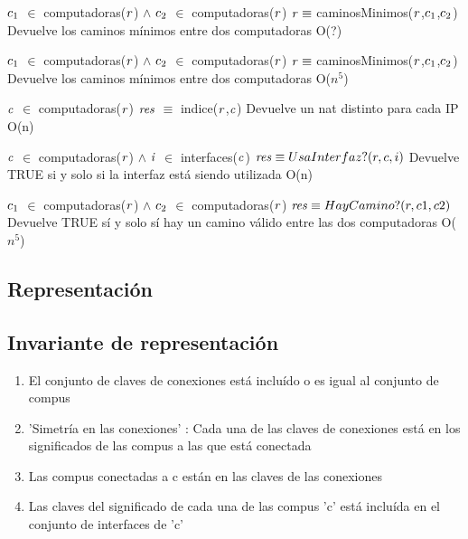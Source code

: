  {$\text{\textit{$c_{1}$}}$ $\in$ computadoras($\text{\textit{r}}$) $\land$ $\text{\textit{$c_{2}$}}$ $\in$ computadoras($\text{\textit{r}}$)}
 {$\text{\textit{r}} \equiv$ caminosMinimos($\text{\textit{r}}$,$\text{\textit{$c_{1}$}}$,$\text{\textit{$c_{2}$}}$)}
 {Devuelve los caminos mínimos entre dos computadoras}
 {O(?)}

 {$\text{\textit{$c_{1}$}}$ $\in$ computadoras($\text{\textit{r}}$) $\land$ $\text{\textit{$c_{2}$}}$ $\in$ computadoras($\text{\textit{r}}$)}
 {$\text{\textit{r}} \equiv$ caminosMinimos($\text{\textit{r}}$,$\text{\textit{$c_{1}$}}$,$\text{\textit{$c_{2}$}}$)}
 {Devuelve los caminos mínimos entre dos computadoras}
 {O($n^5$)}


 {$\text{\textit{c}}$ $\in$ computadoras($\text{\textit{r}}$)}
 {$\text{\textit{res}}$ $\equiv$ indice($\text{\textit{r}}$,$\text{\textit{c}}$)}
 {Devuelve un nat distinto para cada IP}
 {O(n)}

 {$\text{\textit{c}}$ $\in$ computadoras($\text{\textit{r}}$) $\land$ $\text{\textit{i}}$ $\in$ interfaces($\text{\textit{c}}$)}
 {$\text{\textit{res}} \equiv UsaInterfaz?(r,c,i)$}
 {Devuelve TRUE si y solo si la interfaz está siendo utilizada}
 {O(n)}

 {$\text{\textit{$c_{1}$}}$ $\in$ computadoras($\text{\textit{r}}$) $\land$ $\text{\textit{$c_{2}$}}$ $\in$ computadoras($\text{\textit{r}}$)}
 {$\text{\textit{res}} \equiv HayCamino?(r,c1,c2)$}
 {Devuelve TRUE sí y solo sí hay un camino válido entre las dos computadoras}
 {O($n^5$)}

\subsection{Representación}

\subsection{Invariante de representación}
\begin{enumerate}
\item El conjunto de claves de conexiones está incluído o es igual al conjunto de compus
\item 'Simetría en las conexiones' : Cada una de las claves de conexiones está en los significados de las compus a las que está conectada
\item Las compus conectadas a c están en las claves de las conexiones
\item Las claves del significado de cada una de las compus 'c' está incluída en el conjunto de interfaces de 'c'
\end{enumerate}

